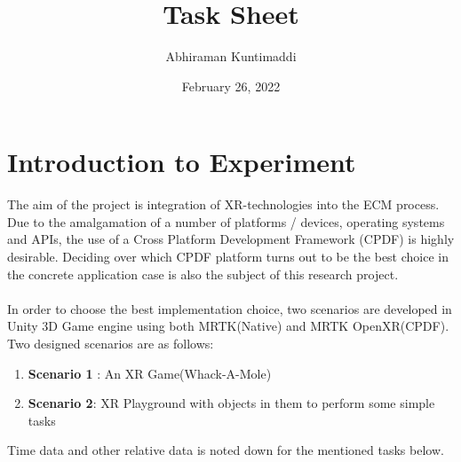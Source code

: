 \documentclass{article}
\title{\textbf{Task Sheet}}
\author{Abhiraman Kuntimaddi}
\date{February 26, 2022}
\begin{document}
\maketitle

\section*{Introduction to Experiment}
The aim of the project is integration of XR-technologies into the ECM process.
Due to the amalgamation of a number of platforms / devices, operating systems and APIs,
the use of a Cross Platform Development Framework (CPDF) is highly desirable. Deciding over
which CPDF platform turns out to be the best choice in the concrete application case is also the subject of this research project.\\~\\
In order to choose the best implementation choice, two scenarios are developed in Unity 3D Game engine using both MRTK(Native) and MRTK OpenXR(CPDF).
Two designed scenarios are as follows:
\begin{enumerate}
	\item \textbf{Scenario 1} : An XR Game(Whack-A-Mole)
	\item \textbf{Scenario 2}: XR Playground with objects in them to perform some simple tasks

\end{enumerate}

Time data and other relative data is noted down for the mentioned tasks below.
\end{document}
